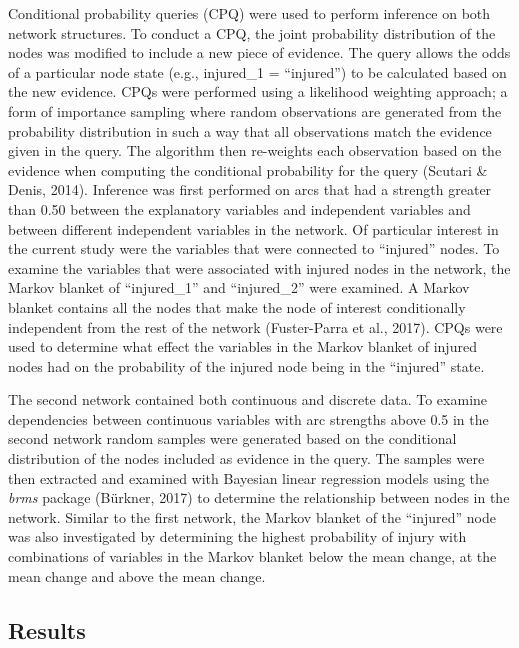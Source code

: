 \documentclass[man,floatsintext]{apa6}
\begin{document}
Conditional probability queries (CPQ) were used to perform inference on both network structures.
To conduct a CPQ, the joint probability distribution of the nodes was modified to include a new piece of evidence.
The query allows the odds of a particular node state (e.g., injured\_1 = \enquote{injured}) to be calculated based on the new evidence.
CPQs were performed using a likelihood weighting approach; a form of importance sampling where random observations are generated from the probability distribution in such a way that all observations match the evidence given in the query.
The algorithm then re-weights each observation based on the evidence when computing the conditional probability for the query (Scutari \& Denis, 2014).
Inference was first performed on arcs that had a strength greater than 0.50 between the explanatory variables and independent variables and between different independent variables in the network.
Of particular interest in the current study were the variables that were connected to \enquote{injured} nodes.
To examine the variables that were associated with injured nodes in the network, the Markov blanket of \enquote{injured\_1} and \enquote{injured\_2} were examined.
A Markov blanket contains all the nodes that make the node of interest conditionally independent from the rest of the network (Fuster-Parra et al., 2017).
CPQs were used to determine what effect the variables in the Markov blanket of injured nodes had on the probability of the injured node being in the \enquote{injured} state.

The second network contained both continuous and discrete data.
To examine dependencies between continuous variables with arc strengths above 0.5 in the second network random samples were generated based on the conditional distribution of the nodes included as evidence in the query.
The samples were then extracted and examined with Bayesian linear regression models using the \emph{brms} package (Bürkner, 2017) to determine the relationship between nodes in the network.
Similar to the first network, the Markov blanket of the \enquote{injured} node was also investigated by determining the highest probability of injury with combinations of variables in the Markov blanket below the mean change, at the mean change and above the mean change.

\newpage

\hypertarget{results-2}{%
\subsection{Results}\label{results-2}}
\end{document}

